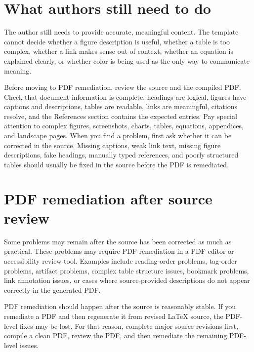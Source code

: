 \section{What authors still need to do}
\label{sec:author-accessibility-work}

The author still needs to provide accurate, meaningful content. The template cannot decide whether a figure description is useful, whether a table is too complex, whether a link makes sense out of context, whether an equation is explained clearly, or whether color is being used as the only way to communicate meaning.

Before moving to PDF remediation, review the source and the compiled PDF. Check that document information is complete, headings are logical, figures have captions and descriptions, tables are readable, links are meaningful, citations resolve, and the References section contains the expected entries. Pay special attention to complex figures, screenshots, charts, tables, equations, appendices, and landscape pages. When you find a problem, first ask whether it can be corrected in the source. Missing captions, weak link text, missing figure descriptions, fake headings, manually typed references, and poorly structured tables should usually be fixed in the source before the PDF is remediated.

\section{PDF remediation after source review}
\label{sec:pdf-remediation-after-source-review}

Some problems may remain after the source has been corrected as much as practical. These problems may require PDF remediation in a PDF editor or accessibility review tool. Examples include reading-order problems, tag-order problems, artifact problems, complex table structure issues, bookmark problems, link annotation issues, or cases where source-provided descriptions do not appear correctly in the generated PDF.

PDF remediation should happen after the source is reasonably stable. If you remediate a PDF and then regenerate it from revised \LaTeX{} source, the PDF-level fixes may be lost. For that reason, complete major source revisions first, compile a clean PDF, review the PDF, and then remediate the remaining PDF-level issues.
